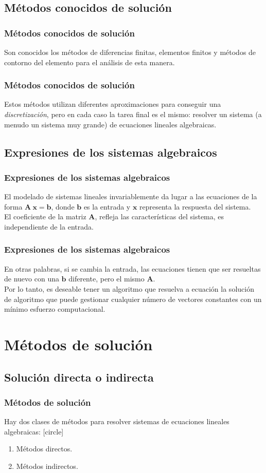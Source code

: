 \subsection{Métodos conocidos de solución}
\begin{frame}
\frametitle{Métodos conocidos de solución}
Son conocidos los métodos de diferencias finitas, elementos finitos y métodos de contorno del elemento para el análisis de esta manera.
\end{frame}
\begin{frame}
\frametitle{Métodos conocidos de solución}
Estos métodos utilizan diferentes aproximaciones para conseguir una \textit{discretización}, pero en cada caso la tarea final es el mismo: resolver un sistema (a menudo un sistema muy grande) de ecuaciones lineales algebraicas.
\end{frame}
\subsection*{Expresiones de los sistemas algebraicos}
\begin{frame}
\frametitle{Expresiones de los sistemas algebraicos}
El modelado de sistemas lineales invariablemente da lugar a las ecuaciones de la forma $\mathbf{A \:x} = \mathbf{b}$, donde $\mathbf{b}$ es la entrada y $\mathbf{x}$ representa la respuesta del sistema.
\\
\bigskip
El coeficiente de la matriz $\mathbf{A}$, refleja las características del sistema, es independiente
de la entrada.
\end{frame}
\begin{frame}
\frametitle{Expresiones de los sistemas algebraicos}
En otras palabras, si se cambia la entrada, las ecuaciones tienen que ser resueltas de nuevo con una $\mathbf{b}$ diferente, pero el mismo $\mathbf{A}$. 
\\
\bigskip
Por lo tanto, es deseable tener un algoritmo que resuelva a ecuación la solución de algoritmo que puede gestionar cualquier número de vectores constantes con un mínimo esfuerzo computacional.
\end{frame}
\section{Métodos de solución}
\subsection{Solución directa o indirecta}
\begin{frame}
\frametitle{Métodos de solución}
Hay dos clases de métodos para resolver sistemas de ecuaciones lineales algebraicas:
[circle]
\begin{enumerate}[<+->]	
\item Métodos directos.
\item Métodos indirectos.
\end{enumerate}
\end{frame}
